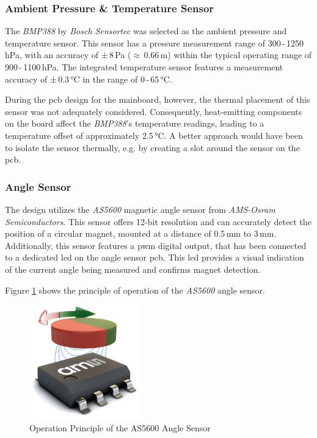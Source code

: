 \subsubsection{Ambient Pressure \& Temperature Sensor}
The \textit{BMP388} by \textit{Bosch Sensortec} was selected as the ambient pressure and temperature sensor.
This sensor has a pressure measurement range of 300\,-\,1250\,hPa, with an accuracy of ±\,8\,Pa ($\approx$\,0.66\,m) within the typical operating range of 900\,-\,1100\,hPa.
The integrated temperature sensor features a measurement accuracy of ±\,0.3\,°C in the range of 0\,-\,65\,°C.

During the \acrshort{pcb} design for the mainboard, however, the thermal placement of this sensor was not adequately considered.
Consequently, heat-emitting components on the board affect the \textit{BMP388}'s temperature readings, leading to a temperature offset of approximately 2.5\,°C.
A better approach would have been to isolate the sensor thermally, e.g. by creating a slot around the sensor on the \acrshort{pcb}.

\subsubsection{Angle Sensor}
The design utilizes the \textit{AS5600} magnetic angle sensor from \textit{AMS-Osram Semiconductors}.
This sensor offers 12-bit resolution and can accurately detect the position of a circular magnet, mounted at a distance of 0.5\,mm to 3\,mm.
Additionally, this sensor features a \acrshort{pwm} digital output, that has been connected to a dedicated \acrshort{led} on the angle sensor \acrshort{pcb}.
This \acrshort{led} provides a visual indication of the current angle being measured and confirms magnet detection.

Figure \ref{fig:angle_sensor_principle} shows the principle of operation of the \textit{AS5600} angle sensor.
\begin{figure}[h!]
	\centering
	\vspace{0.2cm}
	\includegraphics[width=4.8cm]{images/6_design_final/angle_sensor_principle.png}
	\caption{Operation Principle of the AS5600 Angle Sensor \cite{ams_osram_as5600}}
	\label{fig:angle_sensor_principle}
\end{figure}

